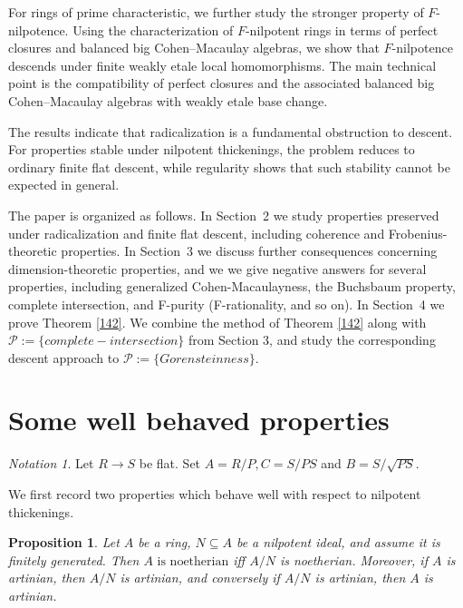 \documentclass[10pt,a4paper]{amsart}
\newtheorem{proposition}[theorem]{Proposition}
\theoremstyle{definition}
\theoremstyle{remark}
\newtheorem{notation}[theorem]{Notation}
\begin{document}
For rings of prime characteristic, we further study the stronger
property of \(F\)-nilpotence.  Using the characterization of
\(F\)-nilpotent rings in terms of perfect closures and balanced big
Cohen--Macaulay algebras, we show that \(F\)-nilpotence descends under
finite weakly etale local homomorphisms.  The main technical point is
the compatibility of perfect closures and the associated balanced big
Cohen--Macaulay algebras with weakly etale base change.

The results indicate that radicalization is a fundamental obstruction
to descent.  For properties stable under nilpotent thickenings, the
problem reduces to ordinary finite flat descent, while regularity shows
that such stability cannot be expected in general.

The paper is organized as follows.  In Section~2 we study properties
preserved under radicalization and finite flat descent, including
coherence and Frobenius-theoretic properties.  In Section~3 we discuss
further consequences concerning dimension-theoretic properties, and we we give negative answers for several properties, including generalized Cohen-Macaulayness, the Buchsbaum property, complete intersection, and 
F-purity  (F-rationality, and so on). 
In
Section~4 we prove {Theorem} \ref{142}.  We combine the method of {Theorem} \ref{142} along with $\mathcal P:=\{complete-intersection\}$ from Section 3, and  study the corresponding descent approach to $\mathcal P:=\{Gorensteinness\}$.


 

\section{Some well behaved properties}
 
 \begin{notation}Let \(R\to S\) be flat. Set
 	$
 	A=R/P,  C=S/PS$ and
 	$B=S/\sqrt{PS}.
 	$ \end{notation}
 We first record two properties which behave well with respect to
 nilpotent thickenings.
 
 \begin{proposition}
 	Let \(A\) be a  ring, \(N\subseteq A\) be a nilpotent
 	ideal, and assume it is finitely generated. Then
 $
 	A\text{ is noetherian}$ iff
 	$A/N$ { is noetherian}.
 Moreover, if \(A\) is artinian, then \(A/N\) is artinian, and conversely
 	if \(A/N\) is artinian, then \(A\) is artinian.
 \end{proposition}
 
\end{document}
